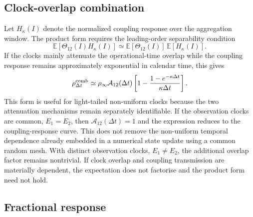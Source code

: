 \documentclass[5p,final]{elsarticle}
\begin{document}
\subsection{Clock-overlap combination}

Let $H_\kappa(I)$ denote the normalized coupling response over the aggregation window. The product form requires the leading-order separability condition
\begin{equation}
    \mathbb{E}[\Theta_{12}(I)H_\kappa(I)]
    \simeq
    \mathbb{E}[\Theta_{12}(I)]\,\mathbb{E}[H_\kappa(I)].
    \label{eq:clock-coupling-separability}
\end{equation}
If the clocks mainly attenuate the operational-time overlap while the coupling response remains approximately exponential in calendar time, this gives
\begin{equation}
    \rho_{\Delta t}^{\rm comb}
    \simeq
    \rho_\infty\mathcal{A}_{12}(\Delta t)
    \left[1-\frac{1-e^{-\kappa\Delta t}}{\kappa\Delta t}\right].
\end{equation}
This form is useful for light-tailed non-uniform clocks because the two attenuation mechanisms remain separately identifiable. If the observation clocks are common, $E_1=E_2$, then $\mathcal A_{12}(\Delta t)=1$ and the expression reduces to the coupling-response curve. This does not remove the non-uniform temporal dependence already embedded in a numerical state update using a common random mesh. With distinct observation clocks, $E_1\ne E_2$, the additional overlap factor remains nontrivial. If clock overlap and coupling transmission are materially dependent, the expectation does not factorise and the product form need not hold.


\subsection{Fractional response}
\end{document}
